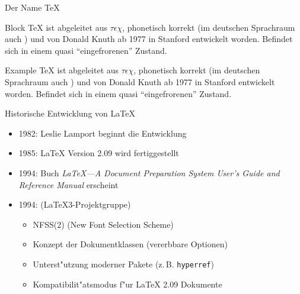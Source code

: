 \documentclass[ngerman,size=12pt,mode=present,paper=a4paper,
style=BerlinFU,mode=present]{pst-powerdot}
\begin{document}
\begin{slide}{Der Name \TeX}
\begin{block}{Block}
\TeX{} ist abgeleitet aus $\tau\epsilon\chi$, phonetisch
	korrekt \textipa{[teX]} (im  deutschen Sprachraum auch \textipa{[te\c{c}]})
und von Donald Knuth ab 1977 in Stanford entwickelt worden. Befindet sich in einem quasi
"`eingefrorenen"' Zustand.
\end{block}

\begin{block}[\textwidth][example]{Example}
\TeX{} ist abgeleitet aus $\tau\epsilon\chi$, phonetisch
	korrekt \textipa{[teX]} (im  deutschen Sprachraum auch \textipa{[te\c{c}]})
und von Donald Knuth ab 1977 in Stanford entwickelt worden. Befindet sich in einem quasi
"`eingefrorenen"' Zustand.
\end{block}
\end{slide}



\begin{slide}{Historische Entwicklung von \LaTeX}
  \def\NtS{$\mathcal{N}$\kern-.1667em\lower.5ex\hbox{$\mathcal{T}$}\kern-.125em  $\mathcal{S}$} %
  \begin{itemize}[type=1]%
  	\item 1982: {\sc Leslie Lamport} beginnt die Entwicklung		\pause
	\item 1985: \LaTeX\/ Version 2.09 wird fertiggestellt		\pause
	\item 1994: Buch {\sl \LaTeX---A Document Preparation
		System User's Guide and Reference Manual} erscheint		\pause
	\item 1994: \LaTeXe\/ (\LaTeX3-Projektgruppe)		\pause
		\begin{itemize}
			\item NFSS(2) {\tiny (New Font Selection Scheme)}		\pause
			\item Konzept der Dokumentklassen {\tiny (vererbbare Optionen)}		\pause
			\item Unterst"utzung moderner Pakete (z.\,B. {\tt hyperref})		\pause
			\item Kompatibilit"atsmodus f"ur \LaTeX\/ 2.09 Dokumente		\pause
		\end{itemize}
  \end{itemize}
\end{slide}
\end{document}
